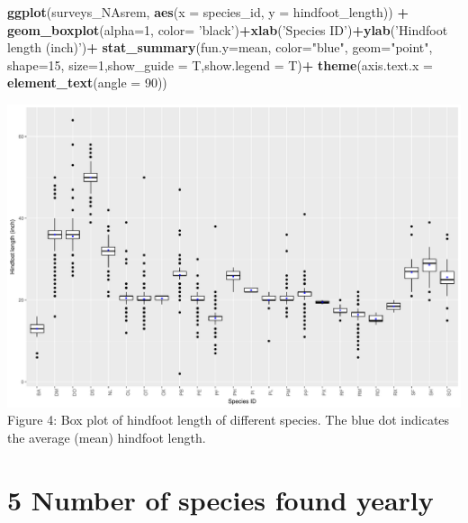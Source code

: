 \documentclass[]{article}
\newenvironment{Shaded}{\begin{snugshade}}{\end{snugshade}}
\newcommand{\KeywordTok}[1]{\textcolor[rgb]{0.13,0.29,0.53}{\textbf{#1}}}
\newcommand{\DataTypeTok}[1]{\textcolor[rgb]{0.13,0.29,0.53}{#1}}
\newcommand{\DecValTok}[1]{\textcolor[rgb]{0.00,0.00,0.81}{#1}}
\newcommand{\StringTok}[1]{\textcolor[rgb]{0.31,0.60,0.02}{#1}}
\newcommand{\OperatorTok}[1]{\textcolor[rgb]{0.81,0.36,0.00}{\textbf{#1}}}
\newcommand{\NormalTok}[1]{#1}
\begin{document}
\begin{Shaded}
\begin{Highlighting}[]
\KeywordTok{ggplot}\NormalTok{(surveys_NAsrem, }\KeywordTok{aes}\NormalTok{(}\DataTypeTok{x =}\NormalTok{ species_id, }\DataTypeTok{y =}\NormalTok{ hindfoot_length)) }\OperatorTok{+}
\StringTok{  }\KeywordTok{geom_boxplot}\NormalTok{(}\DataTypeTok{alpha=}\DecValTok{1}\NormalTok{, }\DataTypeTok{color=} \StringTok{'black'}\NormalTok{)}\OperatorTok{+}\KeywordTok{xlab}\NormalTok{(}\StringTok{'Species ID'}\NormalTok{)}\OperatorTok{+}\KeywordTok{ylab}\NormalTok{(}\StringTok{'Hindfoot length (inch)'}\NormalTok{)}\OperatorTok{+}
\StringTok{  }\KeywordTok{stat_summary}\NormalTok{(}\DataTypeTok{fun.y=}\NormalTok{mean, }\DataTypeTok{color=}\StringTok{"blue"}\NormalTok{, }\DataTypeTok{geom=}\StringTok{"point"}\NormalTok{,  }\DataTypeTok{shape=}\DecValTok{15}\NormalTok{, }\DataTypeTok{size=}\DecValTok{1}\NormalTok{,}\DataTypeTok{show_guide =}\NormalTok{ T,}\DataTypeTok{show.legend =}\NormalTok{ T)}\OperatorTok{+}\StringTok{ }\KeywordTok{theme}\NormalTok{(}\DataTypeTok{axis.text.x =} \KeywordTok{element_text}\NormalTok{(}\DataTypeTok{angle =} \DecValTok{90}\NormalTok{))}
\end{Highlighting}
\end{Shaded}

\includegraphics{figs/boxplot_hindfoot_lengths_different_species-1.pdf}
Figure 4: Box plot of hindfoot length of different species. The blue dot
indicates the average (mean) hindfoot length.

\section{5 Number of species found
yearly}\label{number-of-species-found-yearly}
\end{document}
